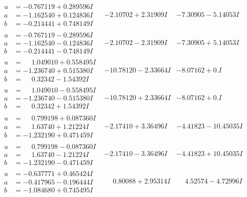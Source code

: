 \documentclass[1p]{elsarticle_modified}
\theoremstyle{definition}
\begin{document}
$$\begin{array}{c|c|c}
\begin{aligned}
u &= -0.767119 + 0.289596 I \\
a &= -1.162540 + 0.124836 I \\
b &= -0.214441 + 0.748149 I\end{aligned}
 & -2.10702 + 2.31909 I & -7.30905 - 5.14053 I \\ \hline\begin{aligned}
u &= -0.767119 - 0.289596 I \\
a &= -1.162540 - 0.124836 I \\
b &= -0.214441 - 0.748149 I\end{aligned}
 & -2.10702 - 2.31909 I & -7.30905 + 5.14053 I \\ \hline\begin{aligned}
u &= \phantom{-}1.049010 + 0.558495 I \\
a &= -1.236740 + 0.515380 I \\
b &= \phantom{-}0.32342 - 1.54392 I\end{aligned}
 & -10.78120 - 2.33664 I & -8.07162 + 0. I\phantom{ +0.000000I} \\ \hline\begin{aligned}
u &= \phantom{-}1.049010 - 0.558495 I \\
a &= -1.236740 - 0.515380 I \\
b &= \phantom{-}0.32342 + 1.54392 I\end{aligned}
 & -10.78120 + 2.33664 I & -8.07162 + 0. I\phantom{ +0.000000I} \\ \hline\begin{aligned}
u &= \phantom{-}0.799198 + 0.087360 I \\
a &= \phantom{-}1.63740 + 1.21224 I \\
b &= -1.232190 + 0.471459 I\end{aligned}
 & -2.17410 + 3.36496 I & -4.41823 - 10.45035 I \\ \hline\begin{aligned}
u &= \phantom{-}0.799198 - 0.087360 I \\
a &= \phantom{-}1.63740 - 1.21224 I \\
b &= -1.232190 - 0.471459 I\end{aligned}
 & -2.17410 - 3.36496 I & -4.41823 + 10.45035 I \\ \hline\begin{aligned}
u &= -0.637771 + 0.465424 I \\
a &= -0.417965 - 0.196444 I \\
b &= -1.084680 + 0.745495 I\end{aligned}
 & \phantom{-}0.80088 + 2.95314 I & \phantom{-}4.52574 - 4.72996 I \\ \hline\begin{aligned}

\end{aligned}
\end{array}$$
\end{document}
